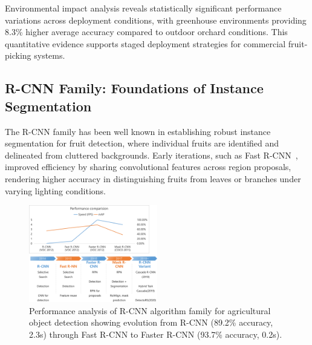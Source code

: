 \documentclass{ieeeaccess}
\begin{document}
Environmental impact analysis reveals statistically significant performance variations across deployment conditions, with greenhouse environments providing 8.3\% higher average accuracy compared to outdoor orchard conditions. This quantitative evidence supports staged deployment strategies for commercial fruit-picking systems.


\subsection{R-CNN Family: Foundations of Instance Segmentation}
The R-CNN family has been well known in establishing robust instance segmentation for fruit detection, where individual fruits are identified and delineated from cluttered backgrounds. Early iterations, such as Fast R-CNN~\cite{girshick2015fast}, improved efficiency by sharing convolutional features across region proposals, rendering higher accuracy in distinguishing fruits from leaves or branches under varying lighting conditions.
\begin{figure}[hbtp]
\centering
\includegraphics[width=0.5\textwidth]{fig_rcnn1.png}
\caption{Performance analysis of R-CNN algorithm family for agricultural object detection showing evolution from R-CNN (89.2\% accuracy, 2.3s) through Fast R-CNN to Faster R-CNN (93.7\% accuracy, 0.2s).}
\label{fig:performance_rcnn}
\end{figure}
\end{document}

